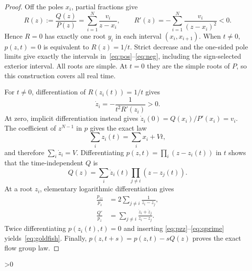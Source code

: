 \documentclass[10pt]{article}
\providecommand{\CRevisionRound}{2}
\begin{document}
\begin{proof}
Off the poles $x_i$, partial fractions give
\begin{equation}\label{eq:R}
 R(z):=\frac{Q(z)}{P(z)}=\sum_{i=1}^N\frac{v_i}{z-x_i},
 \qquad R'(z)=-\sum_{i=1}^N\frac{v_i}{(z-x_i)^2}<0.
\end{equation}
Hence $R=0$ has exactly one root $y_i$ in each interval
$(x_i,x_{i+1})$.  When $t\ne0$, $p(z,t)=0$ is equivalent to $R(z)=1/t$.
Strict decrease and the one-sided pole limits give exactly the intervals
in~\eqref{eq:pos}--\eqref{eq:neg}, including the sign-selected exterior
interval.  All roots are simple.  At $t=0$ they are the simple roots of
$P$, so this construction covers all real time.

For $t\ne0$, differentiation of $R(z_i(t))=1/t$ gives
\begin{equation}\label{eq:velocity}
 \dot z_i=-\frac1{t^2R'(z_i)}>0.
\end{equation}
At zero, implicit differentiation instead gives
$\dot z_i(0)=Q(x_i)/P'(x_i)=v_i$.  The coefficient of $z^{N-1}$ in $p$
gives the exact law
\begin{equation}\label{eq:vieta}
 \sum_i z_i(t)=\sum_i x_i+Vt,
\end{equation}
and therefore $\sum_i\dot z_i=V$.  Differentiating
$p(z,t)=\prod_i(z-z_i(t))$ in $t$ shows that the time-independent $Q$ is
\begin{equation}\label{eq:invariant}
 Q(z)=\sum_i\dot z_i(t)\prod_{j\ne i}(z-z_j(t)).
\end{equation}
At a root $z_i$, elementary logarithmic differentiation gives
\begin{align}
 \frac{p_{zz}}{p_z}&=2\sum_{j\ne i}\frac1{z_i-z_j},\label{eq:pzz}\\
 \frac{Q'}{p_z}&=\sum_{j\ne i}\frac{\dot z_i+\dot z_j}{z_i-z_j}.
 \label{eq:qprime}
\end{align}
Twice differentiating $p(z_i(t),t)=0$ and inserting
\eqref{eq:pzz}--\eqref{eq:qprime} yields~\eqref{eq:goldfish}.  Finally,
$p(z,t+s)=p(z,t)-sQ(z)$ proves the exact flow group law.
\end{proof}

\ifnum\CRevisionRound>0
\end{document}
